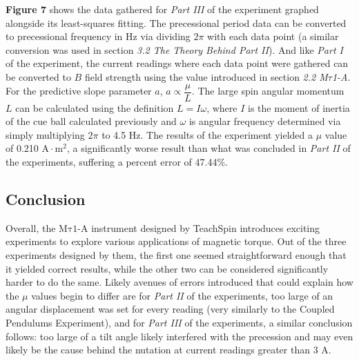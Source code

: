 \documentclass[12pt]{article}
\newcommand{\mtauonea}{\mathrm{M\tau1}\text{-}\mathrm{A}}
\begin{document}
\begin{multicols}{2}
\textbf{Figure 7} shows the data gathered for \textit{Part III} of the experiment graphed alongside its least-squares fitting.
The precessional period data can be converted to precessional frequency in Hz via dividing $2\pi$ with each
data point (a similar conversion was used in section \textit{3.2 The Theory Behind Part II}).
And like \textit{Part I} of the experiment, the current readings where each data point were gathered
can be converted to $B$ field strength using the value introduced in section \textit{2.2 M$\tau$1-A}.
For the predictive slope parameter $a$, $a\propto\dfrac{\mu}{L}$. The large spin angular momentum $L$
can be calculated using the definition $L=I\omega$, where $I$ is the moment of inertia of the cue ball
calculated previously and $\omega$ is angular frequency determined via simply multiplying $2\pi$ to 4.5 Hz.
The results of the experiment yielded a $\mu$ value of 0.210 $\mathrm{A\cdot m^2}$,
a significantly worse result than what was concluded in \textit{Part II} of the experiments,
suffering a percent error of 47.44\%.

\subsection{Conclusion}
Overall, the $\mtauonea$ instrument designed by TeachSpin introduces exciting experiments
to explore various applications of magnetic torque. Out of the three experiments designed by
them, the first one seemed straightforward enough that it yielded correct results,
while the other two can be considered significantly harder to do the same.
Likely avenues of errors introduced that could explain how the $\mu$ values begin
to differ are for \textit{Part II} of the experiments, too large of an angular
displacement was set for every reading (very similarly to the Coupled Pendulums Experiment),
and for \textit{Part III} of the experiments, a similar conclusion follows:
too large of a tilt angle likely interfered with the precession and may even likely
be the cause behind the nutation at current readings greater than 3 A.

\end{multicols}

\newpage
\end{document}
